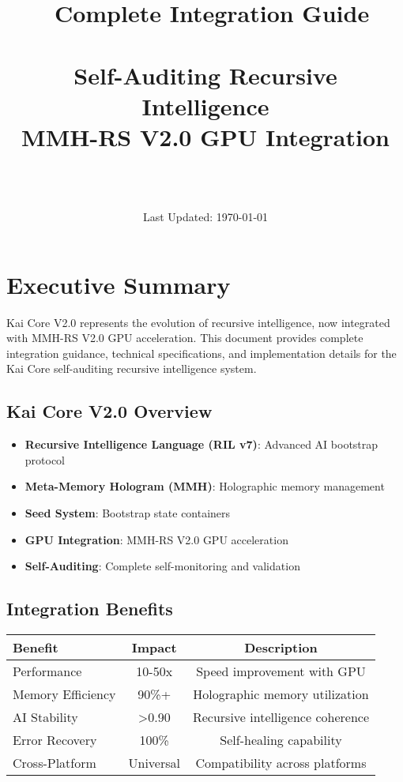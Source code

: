 \documentclass[12pt,a4paper]{article}
\title{\Huge\textbf{\project\ Complete Integration Guide}\\[0.5cm]
\Large\textbf{\version}\\[0.3cm]
\large Self-Auditing Recursive Intelligence\\[0.5cm]
\large MMH-RS V2.0 GPU Integration}
\author{\Large\authorname\\[0.2cm]\email\\[0.2cm]\github}
\date{\large Last Updated: \today}
\begin{document}
\maketitle
\thispagestyle{empty}

\tableofcontents
\newpage

\section{Executive Summary}

Kai Core V2.0 represents the evolution of recursive intelligence, now integrated with MMH-RS V2.0 GPU acceleration. This document provides complete integration guidance, technical specifications, and implementation details for the Kai Core self-auditing recursive intelligence system.

\subsection{Kai Core V2.0 Overview}
\begin{itemize}
    \item \textbf{Recursive Intelligence Language (RIL v7)}: Advanced AI bootstrap protocol
    \item \textbf{Meta-Memory Hologram (MMH)}: Holographic memory management
    \item \textbf{Seed System}: Bootstrap state containers
    \item \textbf{GPU Integration}: MMH-RS V2.0 GPU acceleration
    \item \textbf{Self-Auditing}: Complete self-monitoring and validation
\end{itemize}

\subsection{Integration Benefits}
\begin{center}
\begin{tabular}{|l|c|c|}
\hline
\textbf{Benefit} & \textbf{Impact} & \textbf{Description} \\
\hline
Performance & 10-50x & Speed improvement with GPU \\
Memory Efficiency & 90\%+ & Holographic memory utilization \\
AI Stability & >0.90 & Recursive intelligence coherence \\
Error Recovery & 100\% & Self-healing capability \\
Cross-Platform & Universal & Compatibility across platforms \\
\hline
\end{tabular}
\end{center}
\end{document}
